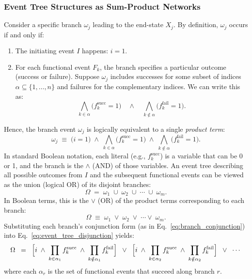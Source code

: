 \subsubsection{Event Tree Structures as Sum-Product Networks}
Consider a specific branch \(\omega_j\) leading to the end-state \(X_j\).  By definition, \(\omega_j\) occurs if and only if:
\begin{enumerate}
    \item The initiating event \(I\) happens: \(i=1\).
    \item For each functional event \(F_k\), the branch specifies a particular outcome (success or failure).  Suppose \(\omega_j\) includes successes for some subset of indices \(\alpha\subseteq \{1,\ldots,n\}\) and failures for the complementary indices.  We can write this as:
    \[
        \bigwedge_{k\in \alpha}  \bigl(f_{k}^{\text{succ}} = 1\bigr)
        \quad\wedge\quad
        \bigwedge_{k\notin \alpha} \bigl(f_{k}^{\text{fail}} = 1\bigr).
    \]
\end{enumerate}
Hence, the branch event \(\omega_j\) is logically equivalent to a single \emph{product term}:
\begin{equation}
\label{eq:branch_conjunction}
    \omega_j \;\equiv\; 
    \bigl(i=1\bigr)
    \;\wedge\;
    \bigwedge_{k\in \alpha} \bigl(f_k^{\text{succ}}=1\bigr)
    \;\wedge\;
    \bigwedge_{k\notin \alpha} \bigl(f_k^{\text{fail}}=1\bigr).
\end{equation}
In standard Boolean notation, each literal (e.g., \(f_k^{\text{succ}}\)) is a variable that can be 0 or 1, and the branch is the \(\land\) (AND) of those variables. An event tree describing all possible outcomes from \(I\) and the subsequent functional events can be viewed as the union (logical OR) of its disjoint branches:
\[
    \Omega \;=\; \omega_1 \;\cup\; \omega_2 \;\cup\;\cdots \;\cup\; \omega_m.
\]
In Boolean terms, this is the \(\lor\) (OR) of the product terms corresponding to each branch:
\begin{equation}
\label{eq:event_tree_disjunction}
    \Omega
    \;\equiv\;
    \omega_1
    \;\lor\;
    \omega_2
    \;\lor\;\cdots\lor\;
    \omega_m.
\end{equation}
Substituting each branch's conjunction form (as in Eq.~\eqref{eq:branch_conjunction}) into Eq.~\eqref{eq:event_tree_disjunction} yields:
\[
    \Omega 
    \;\;=\;\;
    \Bigl[
        i \;\wedge\; \prod_{k\in \alpha_1} f_k^{\text{succ}} \;\wedge\; \prod_{k\notin \alpha_1} f_k^{\text{fail}}
    \Bigr]
    \;\;\lor\;\;
    \Bigl[
        i \;\wedge\; \prod_{k\in \alpha_2} f_k^{\text{succ}} \;\wedge\; \prod_{k\notin \alpha_2} f_k^{\text{fail}}
    \Bigr]
    \;\;\lor\;\;
    \cdots
\]
where each \(\alpha_r\) is the set of functional events that succeed along branch \(r\).

